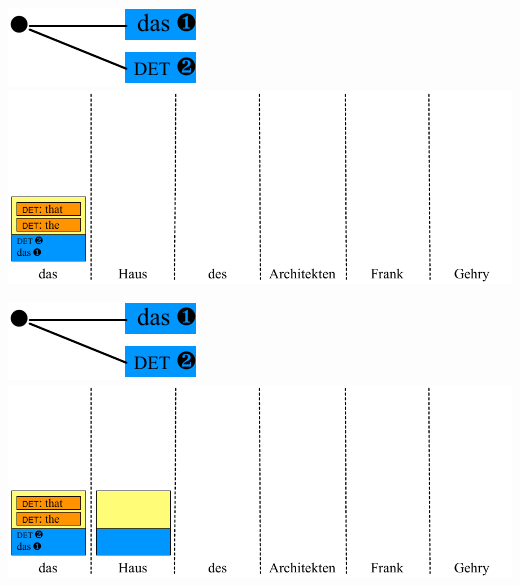 \documentclass[landscape]{slides}
\begin{document}
\begin{center}\vspace{14mm}
\includegraphics[scale=1.4]{accessing-grammar-rules-prefix-early2.pdf}\\[22mm]
\includegraphics[scale=1.4]{accessing-grammar-rules-early-example3.pdf}
\end{center}


\begin{center}\vspace{7mm}
\includegraphics[scale=1.4]{accessing-grammar-rules-prefix-early2.pdf}\\[29mm]
\includegraphics[scale=1.4]{accessing-grammar-rules-early-example4.pdf}
\end{center}

\end{document}
